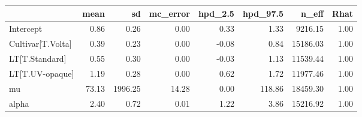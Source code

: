 \begin{tabular}{lrrrrrrr}
\toprule
{} &  mean &      sd &  mc\_error &  hpd\_2.5 &  hpd\_97.5 &    n\_eff &  Rhat \\
\midrule
Intercept         &  0.86 &    0.26 &      0.00 &     0.33 &      1.33 &  9216.15 &  1.00 \\
Cultivar[T.Volta] &  0.39 &    0.23 &      0.00 &    -0.08 &      0.84 & 15186.03 &  1.00 \\
LT[T.Standard]    &  0.55 &    0.30 &      0.00 &    -0.03 &      1.13 & 11539.44 &  1.00 \\
LT[T.UV-opaque]   &  1.19 &    0.28 &      0.00 &     0.62 &      1.72 & 11977.46 &  1.00 \\
mu                & 73.13 & 1996.25 &     14.28 &     0.00 &    118.86 & 18459.30 &  1.00 \\
alpha             &  2.40 &    0.72 &      0.01 &     1.22 &      3.86 & 15216.92 &  1.00 \\
\bottomrule
\end{tabular}
